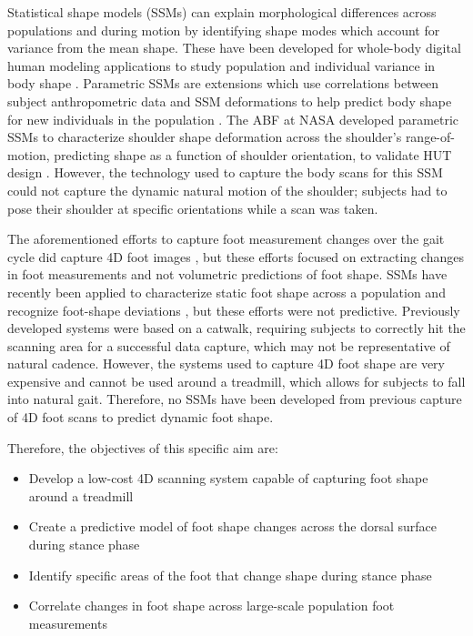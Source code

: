 \documentclass[defaultstyle,11pt]{comps}
\providecommand{\tightlist}{%
  \setlength{\itemsep}{0pt}\setlength{\parskip}{0pt}}
\begin{document}
Statistical shape models (SSMs) can explain morphological differences across populations and during motion by identifying shape modes which account for variance from the mean shape.
These have been developed for whole-body digital human modeling applications to study population and individual variance in body shape \citep{Allen2003, Anguelov2005, Reed2014, Park2015a, Park2017}.
Parametric SSMs are extensions which use correlations between subject anthropometric data and SSM deformations to help predict body shape for new individuals in the population \citep{Park2015a, Park2017}.
The ABF at NASA developed parametric SSMs to characterize shoulder shape deformation across the shoulder's range-of-motion, predicting shape as a function of shoulder orientation, to validate HUT design \citep{Kim2016, Kim2019}.
However, the technology used to capture the body scans for this SSM could not capture the dynamic natural motion of the shoulder; subjects had to pose their shoulder at specific orientations while a scan was taken.

The aforementioned efforts to capture foot measurement changes over the gait cycle did capture 4D foot images \citep{Barisch-Fritz2014, Grau2018}, but these efforts focused on extracting changes in foot measurements and not volumetric predictions of foot shape.
SSMs have recently been applied to characterize static foot shape across a population \citep{Conrad2019} and recognize foot-shape deviations \citep{Stankovic2020, Schuster2021}, but these efforts were not predictive.
Previously developed systems were based on a catwalk, requiring subjects to correctly hit the scanning area for a successful data capture, which may not be representative of natural cadence.
However, the systems used to capture 4D foot shape are very expensive and cannot be used around a treadmill, which allows for subjects to fall into natural gait.
Therefore, no SSMs have been developed from previous capture of 4D foot scans to predict dynamic foot shape.

Therefore, the objectives of this specific aim are:

\begin{itemize}
\tightlist
\item
  Develop a low-cost 4D scanning system capable of capturing foot shape around a treadmill
\item
  Create a predictive model of foot shape changes across the dorsal surface during stance phase
\item
  Identify specific areas of the foot that change shape during stance phase
\item
  Correlate changes in foot shape across large-scale population foot measurements
\end{itemize}
\end{document}
